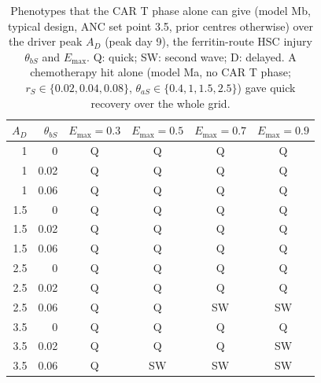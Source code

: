\begin{table}[!htbp]
\centering
\small
\setlength{\tabcolsep}{3.5pt}
\caption{Phenotypes that the CAR T phase alone can give (model Mb, typical design, ANC set point 3.5, prior centres otherwise) over the driver peak $A_D$ (peak day 9), the ferritin-route HSC injury $\theta_{bS}$ and $E_{\max}$. Q: quick; SW: second wave; D: delayed. A chemotherapy hit alone (model Ma, no CAR T phase; $r_S\in\{0.02,0.04,0.08\}$, $\theta_{aS}\in\{0.4,1,1.5,2.5\}$) gave quick recovery over the whole grid.}
\label{tab:screen}
\begin{tabular}{rrcccc}
\toprule
$A_D$ & $\theta_{bS}$ & $E_{\max}=0.3$ & $E_{\max}=0.5$ & $E_{\max}=0.7$ & $E_{\max}=0.9$ \\
\midrule
1 & 0 & Q & Q & Q & Q \\
1 & 0.02 & Q & Q & Q & Q \\
1 & 0.06 & Q & Q & Q & Q \\
1.5 & 0 & Q & Q & Q & Q \\
1.5 & 0.02 & Q & Q & Q & Q \\
1.5 & 0.06 & Q & Q & Q & Q \\
2.5 & 0 & Q & Q & Q & Q \\
2.5 & 0.02 & Q & Q & Q & Q \\
2.5 & 0.06 & Q & Q & SW & SW \\
3.5 & 0 & Q & Q & Q & Q \\
3.5 & 0.02 & Q & Q & Q & SW \\
3.5 & 0.06 & Q & SW & SW & SW \\
\bottomrule
\end{tabular}
\end{table}
